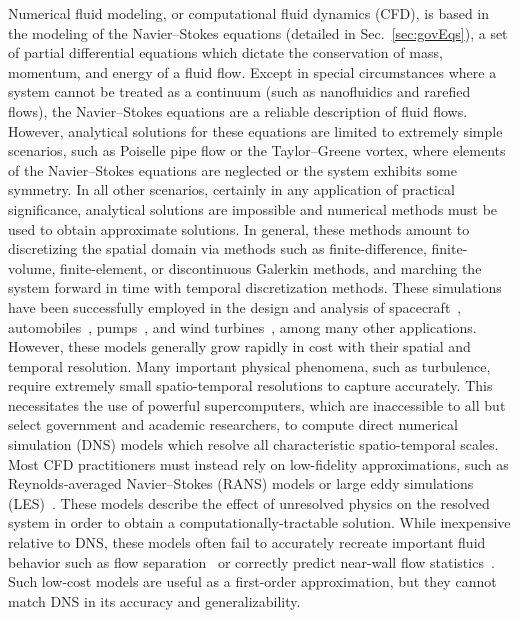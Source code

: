 Numerical fluid modeling, or computational fluid dynamics (CFD), is based in the modeling of the Navier--Stokes equations (detailed in Sec.~\ref{sec:govEqs}), a set of partial differential equations which dictate the conservation of mass, momentum, and energy of a fluid flow. Except in special circumstances where a system cannot be treated as a continuum (such as nanofluidics and rarefied flows), the Navier--Stokes equations are a reliable description of fluid flows. However, analytical solutions for these equations are limited to extremely simple scenarios, such as Poiselle pipe flow or the Taylor--Greene vortex, where elements of the Navier--Stokes equations are neglected or the system exhibits some symmetry. In all other scenarios, certainly in any application of practical significance, analytical solutions are impossible and numerical methods must be used to obtain approximate solutions. In general, these methods amount to discretizing the spatial domain via methods such as finite-difference, finite-volume, finite-element, or discontinuous Galerkin methods, and marching the system forward in time with temporal discretization methods. These simulations have been successfully employed in the design and analysis of spacecraft~\cite{Murman2005}, automobiles~\cite{Kobayashi1992}, pumps~\cite{Shah2013}, and wind turbines~\cite{Sumner2010}, among many other applications. However, these models generally grow rapidly in cost with their spatial and temporal resolution. Many important physical phenomena, such as turbulence, require extremely small spatio-temporal resolutions to capture accurately. This necessitates the use of powerful supercomputers, which are inaccessible to all but select government and academic researchers, to compute direct numerical simulation (DNS) models which resolve all characteristic spatio-temporal scales. Most CFD practitioners must instead rely on low-fidelity approximations, such as Reynolds-averaged Navier--Stokes (RANS) models or large eddy simulations (LES)~\cite{Alfonsi2009,Mason1994}. These models describe the effect of unresolved physics on the resolved system in order to obtain a computationally-tractable solution. While inexpensive relative to DNS, these models often fail to accurately recreate important fluid behavior such as flow separation~\cite{Catalano2003} or correctly predict near-wall flow statistics~\cite{Nicoud2011}. Such low-cost models are useful as a first-order approximation, but they cannot match DNS in its accuracy and generalizability.

